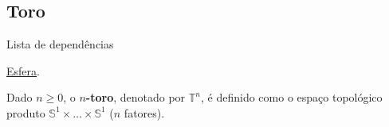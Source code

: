 \subsection{Toro}
\label{toro-def}
\begin{titlemize}{Lista de dependências}
	\item \hyperref[esfera-def]{Esfera}. %
\end{titlemize}
\begin{defi}
     Dado $n\geq 0$, o \textbf{$n$-toro}, denotado por $\mathbb{T}^n$, é definido como o espaço topológico produto $\mathbb{S}^1\times \ldots \times \mathbb{S}^1$ ($n$ fatores).
\end{defi}
